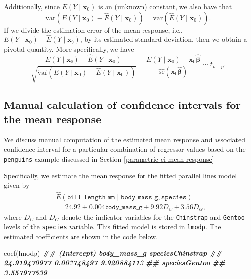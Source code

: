 \documentclass[
]{book}
\newenvironment{Shaded}{\begin{snugshade}}{\end{snugshade}}
\newcommand{\DocumentationTok}[1]{\textcolor[rgb]{0.56,0.35,0.01}{\textbf{\textit{#1}}}}
\newcommand{\FunctionTok}[1]{\textcolor[rgb]{0.00,0.00,0.00}{#1}}
\newcommand{\NormalTok}[1]{#1}
\theoremstyle{definition}
\theoremstyle{definition}
\theoremstyle{definition}
\theoremstyle{definition}
\theoremstyle{remark}
\begin{document}
Additionally, since \(E(Y\mid \mathbf{x}_0)\) is an (unknown) constant, we
also have that
\[\mathrm{var}\left(E(Y\mid \mathbf{x}_0)-\hat{E}(Y\mid \mathbf{x}_0)\right)=\mathrm{var}\left(\hat{E}(Y\mid \mathbf{x}_0)\right).
\]If we divide the estimation error of the mean response, i.e.,
\(E(Y\mid \mathbf{x}_0)-\hat{E}(Y\mid \mathbf{x}_0)\), by its estimated
standard deviation, then we obtain a pivotal quantity. More
specifically, we have \[
\frac{E(Y\mid \mathbf{x}_0)-\hat{E}(Y\mid \mathbf{x}_0)}{\sqrt{\hat{\mathrm{var}}\left(E(Y\mid \mathbf{x}_0)-\hat{E}(Y\mid \mathbf{x}_0)\right)}} = \frac{E(Y\mid \mathbf{x}_0)- \mathbf{x}_0 \hat{\boldsymbol{\beta}}}{ \hat{\mathrm{se}}(\mathbf{x}_0\hat{\boldsymbol{\beta}})}\sim t_{n-p}.
\]

\hypertarget{manual-calc-ci-mean-response}{%
\subsection{Manual calculation of confidence intervals for the mean response}\label{manual-calc-ci-mean-response}}

We discuss manual computation of the estimated mean response and associated confidence interval for a particular
combination of regressor values based on the \texttt{penguins} example discussed in Section \ref{parametric-ci-mean-response}.

Specifically, we estimate the mean response for the fitted parallel
lines model given by\[
\begin{aligned}
&\hat{E}(\mathtt{bill\_length\_mm} \mid \mathtt{body\_mass\_g}, \mathtt{species})\\
&= 24.92 + 0.004 \mathtt{body\_mass\_g} + 9.92 D_C + 3.56 D_G,
\end{aligned}
\]
where \(D_C\) and \(D_G\) denote the indicator variables for the \texttt{Chinstrap} and \texttt{Gentoo} levels of the \texttt{species} variable. This fitted model is stored in \texttt{lmodp}. The estimated coefficients are shown in the code below.

\begin{Shaded}
\begin{Highlighting}[]
\FunctionTok{coef}\NormalTok{(lmodp)}
\DocumentationTok{\#\#      (Intercept)      body\_mass\_g speciesChinstrap }
\DocumentationTok{\#\#     24.919470977      0.003748497      9.920884113 }
\DocumentationTok{\#\#    speciesGentoo }
\DocumentationTok{\#\#      3.557977539}
\end{Highlighting}
\end{Shaded}
\end{document}
